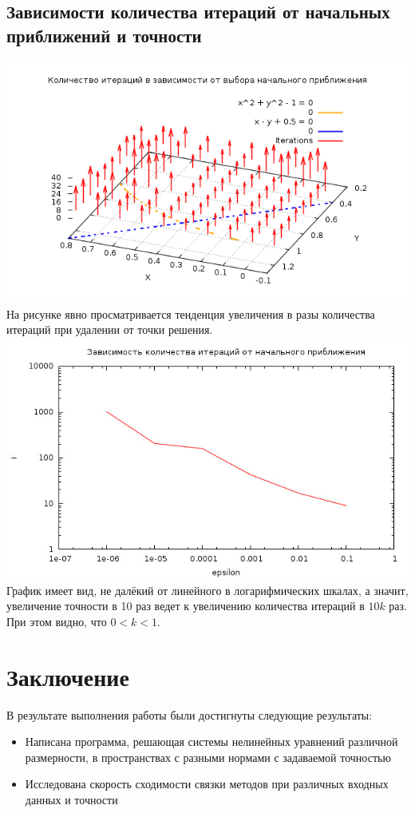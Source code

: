 \documentclass[a4paper, 12pt]{article}
\begin{document}
\subsection*{Зависимости количества итераций от начальных приближений и точности}
\includegraphics[width=\linewidth]{p0.png}\\
На рисунке явно просматривается тенденция увеличения в разы количества итераций при удалении от точки решения.\\
\includegraphics[width=\linewidth]{eps.jpg}
График имеет вид, не далёкий от линейного в логарифмических шкалах, а значит, увеличение точности в 10 раз ведет к увеличению количества итераций в $10k$ раз. При этом видно, что $0 < k < 1$.
\newpage
\section*{Заключение}
В результате выполнения работы были достигнуты следующие результаты:\\
\begin{itemize}
	\item Написана программа, решающая системы нелинейных уравнений различной размерности, в пространствах с разными нормами с задаваемой точностью
	\item Исследована скорость сходимости связки методов при различных входных данных и точности
\end{itemize}
\newpage
{}
\nocite{nm_verg_a}
\nocite{nm_verg_m}
\nocite{RH}
\nocite{RS}

\end{document}
